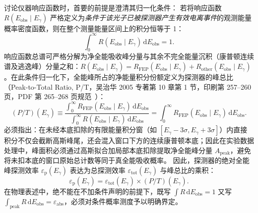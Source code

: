 讨论仪器响应函数时，首要的前提是澄清其归一化条件：
若将响应函数 $R(E_{\mathrm{obs}} \mid E_\gamma)$ 严格定义为\emph{条件于该光子已被探测器产生有效电离事件}的观测能量概率密度函数，则在整个测量能量区间上的积分恒等于 1：
\begin{equation}\label{eq:5-2-norm-cond}
\int_0^\infty R(E_{\mathrm{obs}} \mid E_\gamma) \, \mathrm{d}E_{\mathrm{obs}} = 1.
\end{equation}
响应函数总谱可严格分解为净全能吸收峰分量与其余不完全能量沉积（康普顿连续谱及逃逸峰）分量之和：$R(E_{\mathrm{obs}} \mid E_\gamma) = R_{\mathrm{FEP}}(E_{\mathrm{obs}} \mid E_\gamma) + R_{\mathrm{other}}(E_{\mathrm{obs}} \mid E_\gamma)$。在此条件归一化下，全能峰所占的净能量积分份额定义为探测器的峰总比（Peak-to-Total Ratio, P/T，吴治华 2005 专著第 10 章第 1 节，印刷第 257–260 页，PDF 第 265–268 页规范~\cite{book-wu-nuclear-experiment-methods}）：
\begin{equation}\label{eq:5-2-peak-to-total}
(P/T)(E_\gamma) \equiv \frac{\int_0^\infty R_{\mathrm{FEP}}(E_{\mathrm{obs}} \mid E_\gamma) \, \mathrm{d}E_{\mathrm{obs}}}{\int_0^\infty R(E_{\mathrm{obs}} \mid E_\gamma) \, \mathrm{d}E_{\mathrm{obs}}} = \int_0^\infty R_{\mathrm{FEP}}(E_{\mathrm{obs}} \mid E_\gamma) \, \mathrm{d}E_{\mathrm{obs}}.
\end{equation}
必须指出：在未经本底扣除的有限能量积分窗（如 $[E_\gamma - 3\sigma, E_\gamma + 3\sigma]$）内直接积分不仅会截断高斯峰尾，还会混入窗口下方的连续康普顿本底；因此在实验数据处理中，峰面积必须通过高斯拟合加局部本底扣除提取净全能峰分量 $A_{\mathrm{peak}}$，避免将未扣本底的窗口原始总计数等同于真全能吸收概率。
因此，探测器的绝对全能峰探测效率 $\varepsilon_{\mathrm{p}}(E_\gamma)$ 表达为总探测效率 $\varepsilon_{\mathrm{tot}}(E_\gamma)$ 与峰总比的乘积：
\begin{equation}\label{eq:5-2-eff-decomp}
\varepsilon_{\mathrm{p}}(E_\gamma) = \varepsilon_{\mathrm{tot}}(E_\gamma) \times (P/T)(E_\gamma).
\end{equation}
在物理表述中，绝不能在不加条件声明的前提下，既写 $\int R \, \mathrm{d}E_{\mathrm{obs}} = 1$ 又写 $\int_{\mathrm{peak}} R \, \mathrm{d}E_{\mathrm{obs}} = \varepsilon_{\mathrm{abs}}$，必须对条件概率测度予以明确界定。

